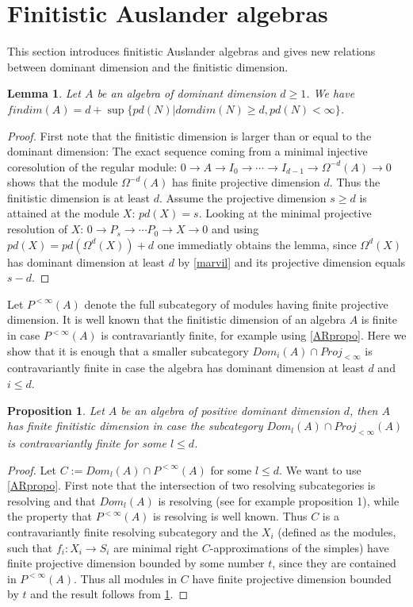 \documentclass[a4paper]{amsart}
\newtheorem{lemma}[theorem]{Lemma}
\newtheorem{proposition}[theorem]{Proposition}
\theoremstyle{definition}
\theoremstyle{remark}
\numberwithin{equation}{theorem}
\begin{document}
\section{Finitistic Auslander algebras}
This section introduces finitistic Auslander algebras and gives new relations between dominant dimension and the finitistic dimension.
\begin{lemma} \label{findimlemma}
Let $A$ be an algebra of dominant dimension $d \geq 1$. \newline
We have $findim(A)=d+\sup \{ pd(N) | domdim(N) \geq d , pd(N) < \infty \}$.
\end{lemma}
\begin{proof}
First note that the finitistic dimension is larger than or equal to the dominant dimension:
The exact sequence coming from a minimal injective coresolution of the regular module: 
$0 \rightarrow A \rightarrow I_0 \rightarrow \cdots \rightarrow I_{d-1} \rightarrow \Omega^{-d}(A) \rightarrow 0$ shows that the module $\Omega^{-d}(A)$ has finite projective dimension $d$. Thus the finitistic dimension is at least $d$.
Assume the projective dimension $s \geq d$ is attained at the module $X$: $pd(X)=s$.
Looking at the minimal projective resolution of $X$: $0 \rightarrow P_s \rightarrow \cdots P_0 \rightarrow X \rightarrow 0$ and using $pd(X)=pd(\Omega^{d}(X))+d$ one immediatly obtains the lemma, since $\Omega^{d}(X)$ has dominant dimension at least $d$ by \ref{marvil} and its projective dimension equals $s-d$.
\end{proof}
Let $P^{< \infty}(A)$ denote the full subcategory of modules having finite projective dimension. It is well known that the finitistic dimension of an algebra $A$ is finite in case $P^{< \infty}(A)$ is contravariantly finite, for example using \ref{ARpropo}. Here we show that it is enough that a smaller subcategory $Dom_i(A) \cap Proj_{<\infty}$ is contravariantly finite in case the algebra has dominant dimension at least $d$ and $i \leq d$.
\begin{proposition}
Let $A$ be an algebra of positive dominant dimension $d$, then $A$ has finite finitistic dimension in case the subcategory $Dom_l(A) \cap Proj_{<\infty}(A)$ is contravariantly finite for some $l \leq d$.
\end{proposition}
\begin{proof}
Let $C:=Dom_l(A) \cap P^{< \infty}(A)$ for some $l \leq d$.
We want to use \ref{ARpropo}. First note that the intersection of two resolving subcategories is resolving and that $Dom_l(A)$ is resolving (see for example \cite{MarVil} proposition 1), while the property that $P^{< \infty}(A)$ is resolving is well known. Thus $C$ is a contravariantly finite resolving subcategory and the $X_i$ (defined as the modules, such that $f_i: X_i \rightarrow S_i$ are minimal right $C$-approximations of the simples) have finite projective dimension bounded by some number $t$, since they are contained in $P^{< \infty}(A)$. Thus all modules in $C$ have finite projective dimension bounded by $t$ and the result follows from \ref{findimlemma}.
\end{proof}
\end{document}
